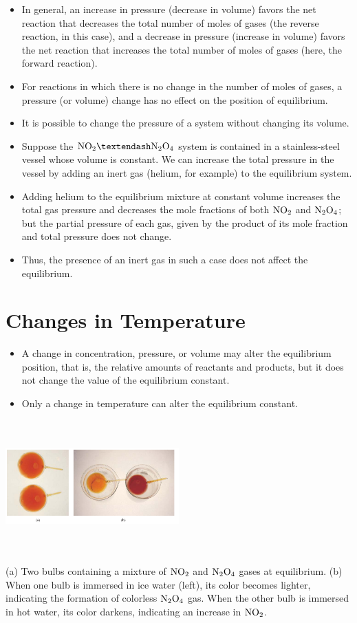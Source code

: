 \documentclass[a4paper,12pt,twocolumn]{article}
\begin{document}
\begin{itemize}
    \item In general, an increase in pressure (decrease in volume) favors the net reaction that decreases the total number of moles of gases (the reverse reaction, in this case), and a decrease in pressure (increase in volume) favors the net reaction that increases the total number of moles of gases (here, the forward reaction). 
    \item For reactions in which there is no change in the number of moles of gases, a pressure (or volume) change has no effect on the position of equilibrium.
    \item It is possible to change the pressure of a system without changing its volume. 
    \item Suppose the $\ce{NO2} – \ce{N2O4}$ system is contained in a stainless-steel vessel whose volume is constant. We can increase the total pressure in the vessel by adding an inert gas (helium, for example) to the equilibrium system. 
    \item Adding helium to the equilibrium mixture at constant volume increases the total gas pressure and decreases the mole fractions of both $\ce{NO2}$ and $\ce{N2O4}$; but the partial pressure of each gas, given by the product of its mole fraction and total pressure does not change. 
    \item Thus, the presence of an inert gas in such a case does not affect the equilibrium.
\end{itemize}

\section{Changes in Temperature}
\begin{itemize}
    \item A change in concentration, pressure, or volume may alter the equilibrium position, that is, the relative amounts of reactants and products, but it does not change the value of the equilibrium constant. 
    \item Only a change in temperature can alter the equilibrium constant.
\end{itemize}
\begin{center}
    \includegraphics[width=0.5\textwidth,height=2in]{Screenshot 2023-03-22 233354.png}
\end{center}
(a) Two bulbs 
containing a mixture of $\ce{NO2}$ and $\ce{N2O4}$ gases at equilibrium. 
(b) When one bulb is immersed  in ice water (left), its color  becomes lighter, indicating the  formation of colorless $\ce{N2O4}$ gas. 
When the other bulb is immersed  in hot water, its color darkens, 
indicating an increase in $\ce{NO2}$.
\end{document}
